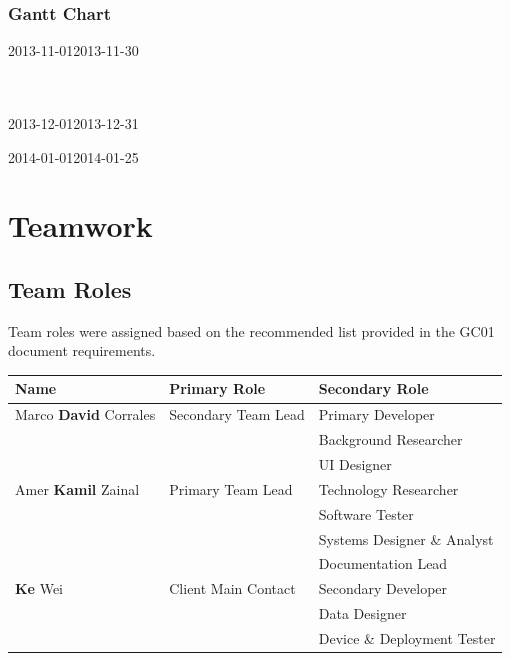 \documentclass[12pt,a4paper,oneside,titlepage]{article}
\begin{document}
\begin{landscape}
\subsubsection{Gantt Chart}
\begin{ganttchart}[
	hgrid,
	vgrid,
	time slot format=isodate
	]{2013-11-01}{2013-11-30}
	 \\
	 \\
	 \ganttnewline
	 \\
\end{ganttchart}


\begin{ganttchart}[
	hgrid,
	vgrid,
	time slot format=isodate
	]{2013-12-01}{2013-12-31}
	 \\
\end{ganttchart}


\begin{ganttchart}[
	hgrid,
	vgrid,
	time slot format=isodate
	]{2014-01-01}{2014-01-25}
	 \\
\end{ganttchart}

\end{landscape}

\newpage
\section{Teamwork}
\subsection{Team Roles}
Team roles were assigned based on the recommended list provided in the GC01 document requirements.
\begin{center}
    \begin{tabular}{ | l | l | p{5.4cm} |}
    \hline
    Name & Primary Role & Secondary Role \\ \hline
    Marco \textbf{David} Corrales & Secondary Team Lead & Primary Developer \\&& Background Researcher \\&& UI Designer \\ \hline
     Amer \textbf{Kamil} Zainal & Primary Team Lead & Technology Researcher \\&& Software Tester \\&& Systems Designer \& Analyst \\&& Documentation Lead \\ \hline
     \textbf{Ke} Wei & Client Main Contact & Secondary Developer \\&& Data Designer \\&& Device \& Deployment Tester \\ \hline
    \end{tabular}
\end{center}
\end{document}
